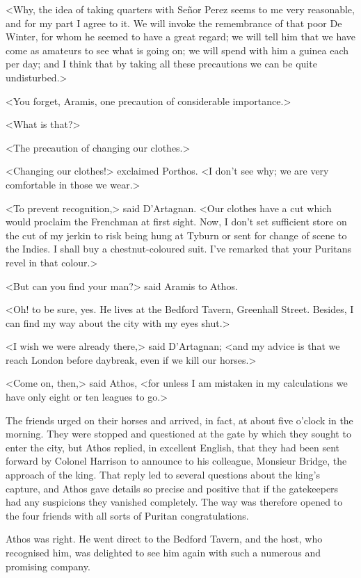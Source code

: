 <Why, the idea of taking quarters with Señor Perez seems to me very reasonable, and for my part I agree to it. We will invoke the remembrance of that poor De Winter, for whom he seemed to have a great regard; we will tell him that we have come as amateurs to see what is going on; we will spend with him a guinea each per day; and I think that by taking all these precautions we can be quite undisturbed.>

<You forget, Aramis, one precaution of considerable importance.>

<What is that?>

<The precaution of changing our clothes.>

<Changing our clothes!> exclaimed Porthos. <I don't see why; we are very comfortable in those we wear.>

<To prevent recognition,> said D'Artagnan. <Our clothes have a cut which would proclaim the Frenchman at first sight. Now, I don't set sufficient store on the cut of my jerkin to risk being hung at Tyburn or sent for change of scene to the Indies. I shall buy a chestnut-coloured suit. I've remarked that your Puritans revel in that colour.>

<But can you find your man?> said Aramis to Athos.

<Oh! to be sure, yes. He lives at the Bedford Tavern, Greenhall Street. Besides, I can find my way about the city with my eyes shut.>

<I wish we were already there,> said D'Artagnan; <and my advice is that we reach London before daybreak, even if we kill our horses.>

<Come on, then,> said Athos, <for unless I am mistaken in my calculations we have only eight or ten leagues to go.>

The friends urged on their horses and arrived, in fact, at about five o'clock in the morning. They were stopped and questioned at the gate by which they sought to enter the city, but Athos replied, in excellent English, that they had been sent forward by Colonel Harrison to announce to his colleague, Monsieur Bridge, the approach of the king. That reply led to several questions about the king's capture, and Athos gave details so precise and positive that if the gatekeepers had any suspicions they vanished completely. The way was therefore opened to the four friends with all sorts of Puritan congratulations.

Athos was right. He went direct to the Bedford Tavern, and the host, who recognised him, was delighted to see him again with such a numerous and promising company.

